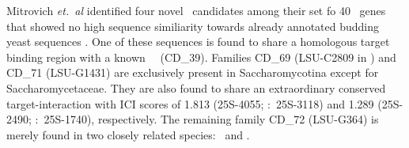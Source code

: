 %
%
%


Mitrovich \emph{et.~al} identified four novel \sno\ candidates among their set fo 40 \sno\ genes that showed no high sequence similiarity towards already annotated budding yeast sequences \cite{Mitrovich:2010}. One of these sequences is found to share a homologous target
binding region with a known \ncr\ \sno\ (CD\_39). Families CD\_69 (LSU-C2809 in \cite{Mitrovich:2010}) and CD\_71 (LSU-G1431)  are exclusively present in Saccharomycotina except for Saccharomycetaceae. They are also found to share an extraordinary conserved target-interaction with ICI scores of 1.813 (25S-4055; \calb:~25S-3118) and 1.289 (25S-2490; \calb:~25S-1740), respectively. The remaining family CD\_72 (LSU-G364) is merely found in two closely related species: \cdu\ and \ctr.



